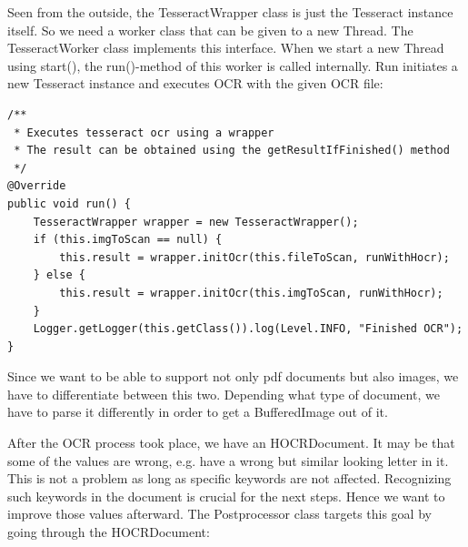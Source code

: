 Seen from the outside, the TesseractWrapper class is just the Tesseract instance itself. So we need a worker class that can be given to a new Thread. The TesseractWorker class implements this interface. When we start a new Thread using start(), the run()-method of this worker is called internally. Run initiates a new Tesseract instance and executes OCR with the given OCR file: 

\begin{lstlisting}[caption={Initiation of the OCR wrapper}]
/**
 * Executes tesseract ocr using a wrapper
 * The result can be obtained using the getResultIfFinished() method
 */
@Override
public void run() {
    TesseractWrapper wrapper = new TesseractWrapper();
    if (this.imgToScan == null) {
        this.result = wrapper.initOcr(this.fileToScan, runWithHocr);
    } else {
        this.result = wrapper.initOcr(this.imgToScan, runWithHocr);
    }
    Logger.getLogger(this.getClass()).log(Level.INFO, "Finished OCR");
}
\end{lstlisting}

Since we want to be able to support not only pdf documents but also images, we have to differentiate between this two. Depending what type of document, we have to parse it differently in order to get a BufferedImage out of it.

After the OCR process took place, we have an HOCRDocument. It may be that some of the values are wrong, e.g. have a wrong but similar looking letter in it. This is not a problem as long as specific keywords are not affected. Recognizing such keywords in the document is crucial for the next steps. Hence we want to improve those values afterward. 
The Postprocessor class targets this goal by going through the HOCRDocument:

